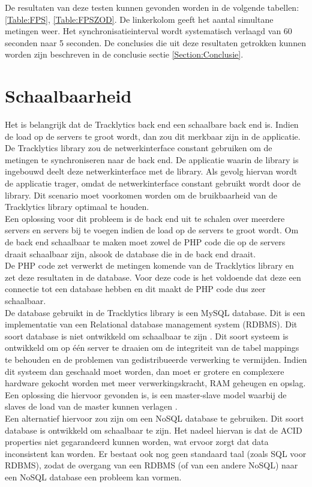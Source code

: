 De resultaten van deze testen kunnen gevonden worden in de volgende tabellen: \ref{Table:FPS}, \ref{Table:FPSZOD}. De linkerkolom geeft het aantal simultane metingen weer. Het synchronisatieinterval wordt systematisch verlaagd van 60 seconden naar 5 seconden. De conclusies die uit deze resultaten getrokken kunnen worden zijn beschreven in de conclusie sectie \ref{Section:Conclusie}.




\section{Schaalbaarheid}
Het is belangrijk dat de Tracklytics back end een schaalbare back end is. Indien de load op de servers te groot wordt, dan zou dit merkbaar zijn in de applicatie. De Tracklytics library zou de netwerkinterface constant gebruiken om de metingen te synchroniseren naar de back end. De applicatie waarin de library is ingebouwd deelt deze netwerkinterface met de library. Als gevolg hiervan wordt de applicatie trager, omdat de netwerkinterface constant gebruikt wordt door de library. Dit scenario moet voorkomen worden om de bruikbaarheid van de Tracklytics library optimaal te houden.\\

Een oplossing voor dit probleem is de back end uit te schalen over meerdere servers en servers bij te voegen indien de load op de servers te groot wordt. Om de back end schaalbaar te maken moet zowel de PHP code die op de servers draait schaalbaar zijn, alsook de database die in de back end draait. \\

De PHP code zet verwerkt de metingen komende van de Tracklytics library en zet deze resultaten in de database. Voor deze code is het voldoende dat deze een connectie tot een database hebben en dit maakt de PHP code dus zeer schaalbaar.\\

De database gebruikt in de Tracklytics library is een MySQL database. Dit is een implementatie van een Relational database management system (RDBMS). Dit soort database is niet ontwikkeld om schaalbaar te zijn \cite{RDBMS}. Dit soort systeem is ontwikkeld om op \'e\'en server te draaien om de integriteit van de tabel mappings te behouden en de problemen van gedistribueerde verwerking te vermijden. Indien dit systeem dan geschaald moet worden, dan moet er grotere en complexere hardware gekocht worden met meer verwerkingskracht, RAM geheugen en opslag. Een oplossing die hiervoor gevonden is, is een master-slave model waarbij de slaves de load van de master kunnen verlagen \cite{MasterSlave}. \\
Een alternatief hiervoor zou zijn om een NoSQL database te gebruiken. Dit soort database is ontwikkeld om schaalbaar te zijn. Het nadeel hiervan is dat de ACID properties niet gegarandeerd kunnen worden, wat ervoor zorgt dat data inconsistent kan worden. Er bestaat ook nog geen standaard taal (zoals SQL voor RDBMS), zodat de overgang van een RDBMS (of van een andere NoSQL) naar een NoSQL database een probleem kan vormen. \\


